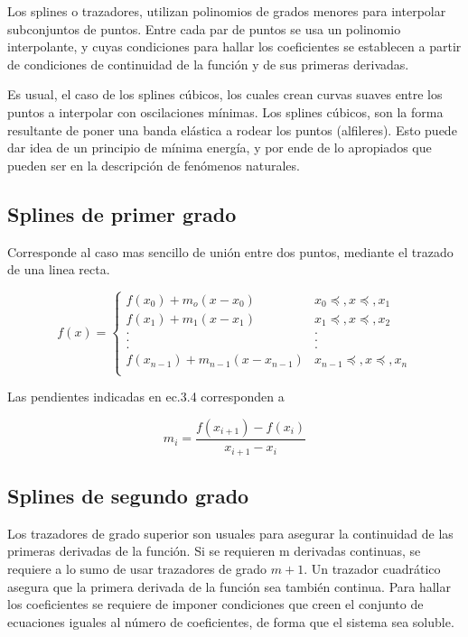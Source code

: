 \documentclass[letterpaper,10pt,oneside]{sphinxmanual}
\theoremstyle{plain}%
\theoremstyle{definition}%
\theoremstyle{remark}%
\begin{document}
Los splines o trazadores, utilizan polinomios de grados menores para interpolar
subconjuntos de puntos. Entre cada par de puntos se usa un polinomio interpolante,
y cuyas condiciones para hallar los coeficientes se establecen a partir de
condiciones de continuidad de la función y de sus primeras derivadas.

Es usual, el caso de los splines cúbicos, los cuales crean curvas suaves entre los
puntos a interpolar con oscilaciones mínimas. Los splines cúbicos, son la forma
resultante de poner una banda elástica a rodear los puntos (alfileres). Esto puede
dar idea de un principio de mínima energía, y por ende de lo apropiados que
pueden ser en la descripción de fenómenos naturales.

\subsection{Splines de primer grado}

Corresponde al caso mas sencillo de unión entre dos puntos, mediante el trazado de una linea recta.

\begin{equation}
	f(x)=
	\begin{cases}
	f(x_0)+m_o(x-x_0)				 & x_0\preceq,x\preceq,x_1 \\
	f(x_1)+m_1(x-x_1)				 & x_1\preceq,x\preceq,x_2 \\ 
	.&. \\
	.&. \\
	.&. \\
	f(x_{n-1})+m_{n-1}(x-x_{n-1})				 & x_{n-1}\preceq,x\preceq,x_n \\
	\end{cases}
\end{equation}

Las pendientes indicadas en ec.3.4 corresponden a 

\begin{equation}
	m_i=\frac{f(x_{i+1})-f(x_i)}{x_{i+1}-x_i}
\end{equation}

\subsection{Splines de segundo grado}

Los trazadores de grado superior son usuales para asegurar la continuidad de
las primeras derivadas de la función. Si se requieren m derivadas continuas, se
requiere a lo sumo de usar trazadores de grado $m + 1$.
Un trazador cuadrático asegura que la primera derivada de la función sea también
continua.
Para hallar los coeficientes se requiere de imponer condiciones que creen el conjunto
de ecuaciones iguales al número de coeficientes, de forma que el sistema sea
soluble.
\end{document}
